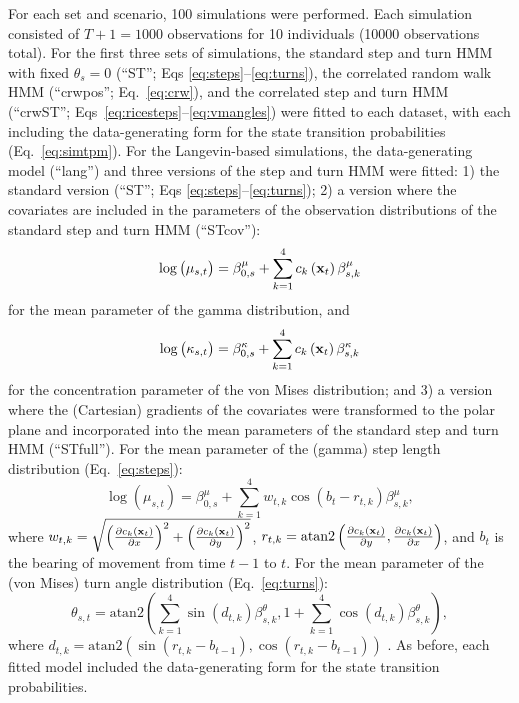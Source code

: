 \documentclass[12pt]{article}\usepackage[]{graphicx}\usepackage[]{xcolor}
\begin{document}
For each set and scenario, 100 simulations were performed. Each simulation consisted of $T+1=1000$ observations for 10 individuals (10000 observations total). For the first three sets of simulations, the standard step and turn HMM with fixed $\theta_s=0$ (``ST''; Eqs \ref{eq:steps}--\ref{eq:turns}), the correlated random walk HMM (``crwpos''; Eq.\ \ref{eq:crw}), and the correlated step and turn HMM (``crwST''; Eqs\ \ref{eq:ricesteps}--\ref{eq:vmangles}) were fitted to each dataset, with each including the data-generating form for the state transition probabilities (Eq.\ \ref{eq:simtpm}). For the Langevin-based simulations, the data-generating model (``lang'') and three versions of the step and turn HMM were fitted: 1) the standard version (``ST''; Eqs \ref{eq:steps}--\ref{eq:turns}); 2) a version where the covariates are included in the parameters of the observation distributions of the standard step and turn HMM (``STcov''):
\begin{equation}
 \log\left(\mu_{s,t}\right) = \beta^{\mu}_{0,s} + \sum_{k=1}^4 c_k \left({\bf x}_t\right) \beta^{\mu}_{s,k}
\end{equation}
for the mean parameter of the gamma distribution, and
\begin{equation}
 \log\left(\kappa_{s,t}\right) = \beta^{\kappa}_{0,s} + \sum_{k=1}^4 c_k \left({\bf x}_t\right) \beta^{\kappa}_{s,k}
\end{equation}
for the concentration parameter of the von Mises distribution; and 3) a version where the (Cartesian) gradients of the covariates were transformed to the polar plane and incorporated into the mean parameters of the standard step and turn HMM (``STfull''). For the mean parameter of the (gamma) step length distribution (Eq.\ \ref{eq:steps}):
\begin{equation}
\label{eq:STfullstep}
 \log\left(\mu_{s,t}\right) = \beta^{\mu}_{0,s} + \sum_{k=1}^4 w_{t,k} \cos\left(b_t - r_{t,k}\right) \beta^{\mu}_{s,k},
\end{equation}
where $w_{t,k} = \sqrt{\left(\frac{\partial c_k\left({\bf x}_t\right)}{\partial x}\right)^2+\left(\frac{\partial c_k\left({\bf x}_t\right)}{\partial y}\right)^2}$, $r_{t,k}=\text{atan2} \left(\frac{\partial c_k\left({\bf x}_t\right)}{\partial y},\frac{\partial c_k\left({\bf x}_t\right)}{\partial x}\right)$, and $b_t$ is the bearing of movement from time $t-1$ to $t$. For the mean parameter of the (von Mises) turn angle distribution (Eq.\ \ref{eq:turns}):
\begin{equation}
\label{eq:STfullangle}
   \theta_{s,t} = \text{atan2} \left(\sum_{k=1}^4 \sin \left(d_{t,k} \right) \beta^\theta_{s,k},1+\sum_{k=1}^4 \cos \left(d_{t,k} \right) \beta^\theta_{s,k} \right),
\end{equation}
where $d_{t,k} = \text{atan2} \left(\sin \left(r_{t,k} - b_{t-1}\right),\cos \left(r_{t,k} - b_{t-1} \right)\right)$ \citep[e.g.,][]{rivest2016general,McClintockMichelot2018}. As before, each fitted model included the data-generating form for the state transition probabilities.
\end{document}
